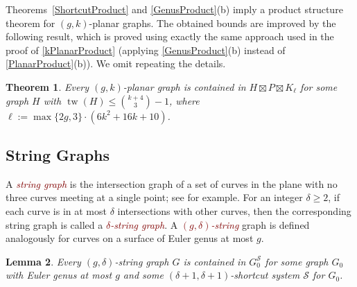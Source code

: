 \documentclass{patmorin}
\theoremstyle{plain}
\newtheorem{thm}{Theorem}
\newtheorem{lem}[thm]{Lemma}
\theoremstyle{definition}
\newcommand{\defin}[1]{\textcolor{Maroon}{\emph{#1}}}
\newcommand{\note}[2]{\noindent{\color{red}[#1:~#2]}}
\DeclareMathOperator{\tw}{tw}
\renewcommand{\SS}{\mathcal{S}}
\renewcommand{\geq}{\geqslant}
\renewcommand{\leq}{\leqslant}
\begin{document}
Theorems~\ref{ShortcutProduct}  and \ref{GenusProduct}(b) imply a product structure theorem for $(g,k)$-planar graphs. The obtained bounds are improved by the following result, which is proved using exactly the same approach used in the proof of \cref{kPlanarProduct} (applying \cref{GenusProduct}(b) instead of \cref{PlanarProduct}(b)). We omit repeating the details.

\begin{thm}
\label{gkPlanarProduct}
Every $(g,k)$-planar graph is contained in $H\boxtimes P \boxtimes K_\ell$ for some graph $H$ with $\tw(H) \leq \binom{k+4}{3}-1$, where $\ell:=\max\{2g,3\}\cdot(6k^2+16k+10)$.
\end{thm}


\subsection{String Graphs}
\label{first_example}

A \defin{string graph} is the intersection graph of a set of curves in the plane with no three curves meeting at a single point; see  \cite{PachToth-DCG02,FP10,FP14} for example. For an integer $\delta\geq 2$, if each curve is in at most $\delta$ intersections with other curves, then the corresponding string graph is called a \defin{$\delta$-string graph}. A \defin{$(g,\delta)$-string} graph is defined analogously for curves on a surface of Euler genus at most $g$.

\begin{lem}
\label{StringShortcut}
Every $(g,\delta)$-string graph $G$ is contained in $G_0^\SS$ for some graph $G_0$ with Euler genus at most $g$ and some $(\delta+1,\delta+1 )$-shortcut system $\SS$ for $G_0$.
\end{lem}
\end{document}
